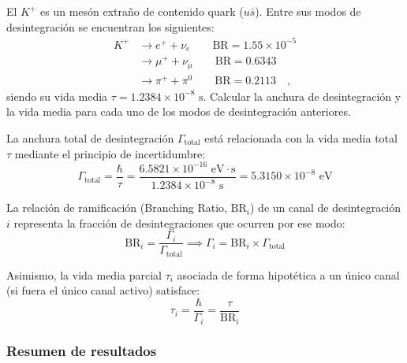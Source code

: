 \newpage
\begin{problema}
El $K^+$ es un mesón extraño de contenido quark ($u\bar{s}$). Entre sus modos de desintegración se encuentran los siguientes:
\begin{align*}
K^+ &\rightarrow e^+ + \nu_e \qquad \text{BR} = 1.55 \times 10^{-5} \\
    &\rightarrow \mu^+ + \nu_\mu \qquad \text{BR} = 0.6343 \\
    &\rightarrow \pi^+ + \pi^0 \qquad \text{BR} = 0.2113 \quad ,
\end{align*}
siendo su vida media $\tau = 1.2384 \times 10^{-8}\text{ s}$. Calcular la anchura de desintegración y la vida media para cada uno de los modos de desintegración anteriores.

\tcblower

La anchura total de desintegración $\Gamma_{\text{total}}$ está relacionada con la vida media total $\tau$ mediante el principio de incertidumbre:
\begin{equation*}
\Gamma_{\text{total}} = \frac{\hbar}{\tau} = \frac{6.5821 \times 10^{-16} \text{ eV}\cdot\text{s}}{1.2384 \times 10^{-8} \text{ s}} =  5.3150 \times 10^{-8} \text{ eV}
\end{equation*}

La relación de ramificación (Branching Ratio, $\text{BR}_i$) de un canal de desintegración $i$ representa la fracción de desintegraciones que ocurren por ese modo:
\begin{equation*}
\text{BR}_i = \frac{\Gamma_i}{\Gamma_{\text{total}}} \implies \Gamma_i = \text{BR}_i \times \Gamma_{\text{total}}
\end{equation*}

Asimismo, la vida media parcial $\tau_i$ asociada de forma hipotética a un único canal (si fuera el único canal activo) satisface:
\begin{equation*}
\tau_i = \frac{\hbar}{\Gamma_i} = \frac{\tau}{\text{BR}_i}
\end{equation*}

\subsubsection*{Resumen de resultados}


\end{problema}

